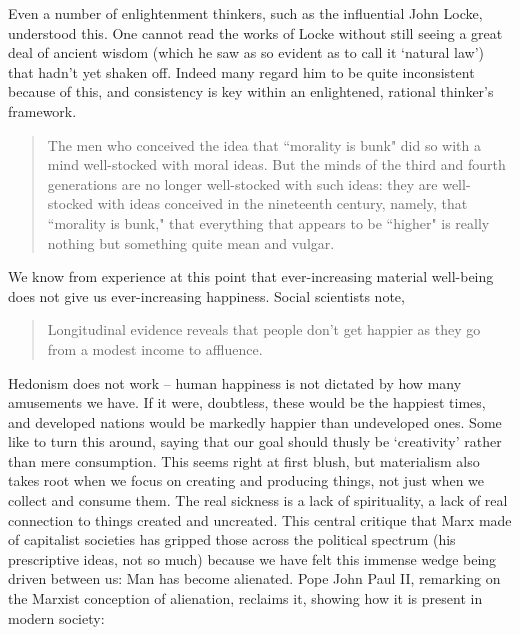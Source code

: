\documentclass[letterpaper]{article}
\begin{document}
  Even a number of enlightenment thinkers, such as the influential John Locke, understood this. One cannot read the works of Locke without still seeing a great deal of ancient wisdom (which he saw as so evident as to call it `natural law') that hadn't yet shaken off. Indeed many regard him to be quite inconsistent because of this, and consistency is key within an enlightened, rational thinker's framework.

  \begin{quote}
    The men who conceived the idea that ``morality is bunk" did so with a mind well-stocked with moral ideas. But the minds of the third and fourth generations are no longer well-stocked with such ideas: they are well-stocked with ideas conceived in the nineteenth century, namely, that ``morality is bunk," that everything that appears to be ``higher" is really nothing but something quite mean and vulgar.
  \end{quote}

  We know from experience at this point that ever-increasing material well-being does not give us ever-increasing happiness. Social scientists note,

  \begin{quote}
    Longitudinal evidence reveals that people don't get happier as they go from a modest income to affluence.
  \end{quote}

  Hedonism does not work -- human happiness is not dictated by how many amusements we have. If it were, doubtless, these would be the happiest times, and developed nations would be markedly happier than undeveloped ones. Some like to turn this around, saying that our goal should thusly be `creativity' rather than mere consumption. This seems right at first blush, but materialism also takes root when we focus on creating and producing things, not just when we collect and consume them. The real sickness is a lack of spirituality, a lack of real connection to things created and uncreated. This central critique that Marx made of capitalist societies has gripped those across the political spectrum (his prescriptive ideas, not so much) because we have felt this immense wedge being driven between us: Man has become alienated. Pope John Paul II, remarking on the Marxist conception of alienation, reclaims it, showing how it is present in modern society:
\end{document}
